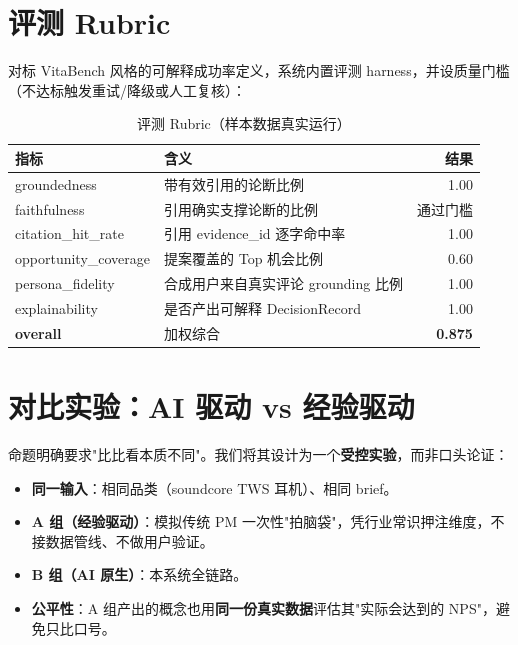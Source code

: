\section{评测 Rubric}

对标 VitaBench 风格的可解释成功率定义，系统内置评测 harness，并设质量门槛（不达标触发重试/降级或人工复核）：

\begin{table}[h]\centering\small
\renewcommand{\arraystretch}{1.2}
\begin{tabularx}{\linewidth}{p{4.6cm} X r}
\toprule
\textbf{指标} & \textbf{含义} & \textbf{结果} \\
\midrule
groundedness & 带有效引用的论断比例 & 1.00 \\
faithfulness & 引用确实支撑论断的比例 & 通过门槛 \\
citation\_hit\_rate & 引用 evidence\_id 逐字命中率 & 1.00 \\
opportunity\_coverage & 提案覆盖的 Top 机会比例 & 0.60 \\
persona\_fidelity & 合成用户来自真实评论 grounding 比例 & 1.00 \\
explainability & 是否产出可解释 DecisionRecord & 1.00 \\
\textbf{overall} & 加权综合 & \textbf{0.875} \\
\bottomrule
\end{tabularx}
\caption{评测 Rubric（样本数据真实运行）}
\end{table}

\section{对比实验：AI 驱动 vs 经验驱动}

命题明确要求"比比看本质不同"。我们将其设计为一个\textbf{受控实验}，而非口头论证：

\begin{itemize}
\item \textbf{同一输入}：相同品类（soundcore TWS 耳机）、相同 brief。
\item \textbf{A 组（经验驱动）}：模拟传统 PM 一次性"拍脑袋"，凭行业常识押注维度，不接数据管线、不做用户验证。
\item \textbf{B 组（AI 原生）}：本系统全链路。
\item \textbf{公平性}：A 组产出的概念也用\textbf{同一份真实数据}评估其"实际会达到的 NPS"，避免只比口号。
\end{itemize}

